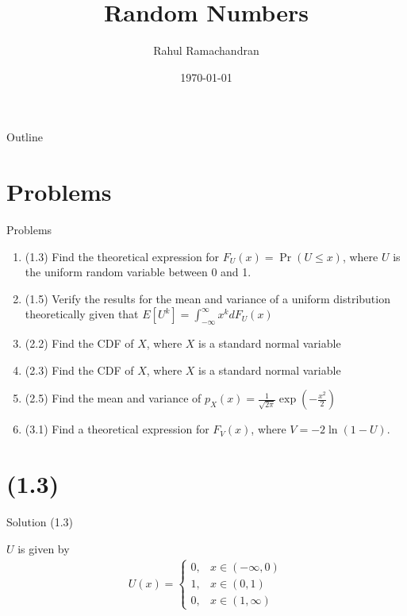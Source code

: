 \documentclass{beamer}
\title{Random Numbers}
\author{Rahul Ramachandran}
\date{\today}
\providecommand{\pr}[1]{\ensuremath{\Pr\left(#1\right)}}
\begin{document}
\begin{frame}
    \titlepage 
\end{frame}

\logo{}


\begin{frame}{Outline}
    \tableofcontents
\end{frame}

\section{Problems}
\begin{frame}{Problems}
    \begin{enumerate}
        \item (1.3) Find the theoretical expression for $F_U(x) = \pr{U \leq x}$, where $U$ is the uniform random variable between 0 and 1.
        \item (1.5) Verify the results for the mean and variance of a uniform distribution theoretically given that $E[U^k] = \int_{-\infty}^{\infty}x^k dF_U(x)$
        \item (2.2) Find the CDF of $X$, where $X$ is a standard normal variable
        \item (2.3) Find the CDF of $X$, where $X$ is a standard normal variable
        \item (2.5) Find the mean and variance of $p_X(x)=\frac{1}{\sqrt{2\pi}}\exp{(-\frac{x^2}{2})}$
        \item (3.1) Find a theoretical expression for $F_V(x)$, where $V = -2\ln(1-U)$.
    \end{enumerate}
\end{frame}

\section{(1.3)}
\begin{frame}{Solution (1.3)}

$U$ is given by 
\begin{align}
    U(x) = 
    \begin{cases}
        0, & x \in (-\infty,0) \\
        1, & x \in (0,1) \\
        0, & x \in (1, \infty)
    \end{cases}
\end{align}

\end{frame}
\end{document}
